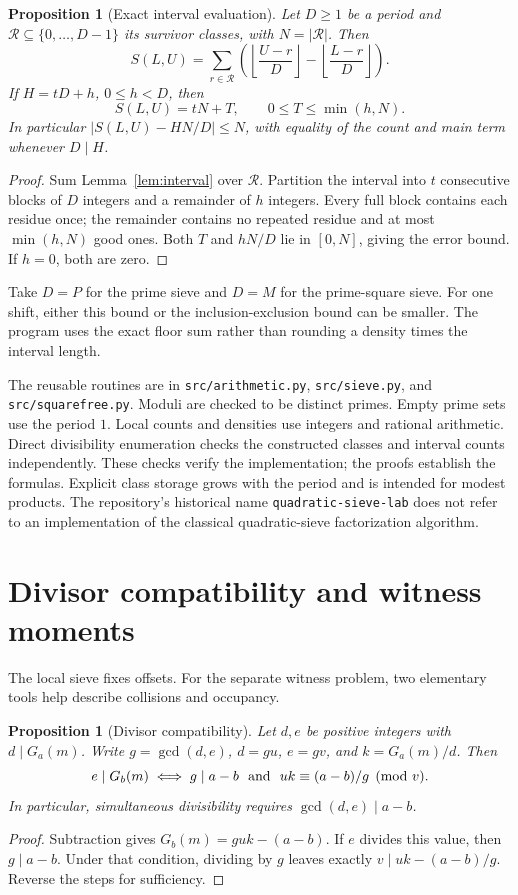 \documentclass[11pt]{article}
\newtheorem{proposition}[theorem]{Proposition}
\theoremstyle{definition}
\theoremstyle{remark}
\begin{document}
\begin{proposition}[Exact interval evaluation]\label{prop:exact}
Let $D\ge1$ be a period and $\mathcal R\subseteq\{0,\ldots,D-1\}$
its survivor classes, with $N=|\mathcal R|$. Then
\[
 S(L,U)=\sum_{r\in\mathcal R}
 \left(\left\lfloor\frac{U-r}D\right\rfloor-
       \left\lfloor\frac{L-r}D\right\rfloor\right).
\]
If $H=tD+h$, $0\le h<D$, then
\[
 S(L,U)=tN+T,\qquad 0\le T\le\min(h,N).
\]
In particular $|S(L,U)-HN/D|\le N$, with equality of the count
and main term whenever $D\mid H$.
\end{proposition}
\begin{proof}
Sum Lemma~\ref{lem:interval} over $\mathcal R$. Partition the interval
into $t$ consecutive blocks of $D$ integers and a remainder of $h$
integers. Every full block contains each residue once; the remainder
contains no repeated residue and at most $\min(h,N)$ good ones.
Both $T$ and $hN/D$ lie in $[0,N]$, giving the error bound.
If $h=0$, both are zero.
\end{proof}

Take $D=P$ for the prime sieve and $D=M$ for the prime-square sieve.
For one shift, either this bound or the inclusion-exclusion bound
can be smaller. The program uses the exact floor sum rather than
rounding a density times the interval length.

The reusable routines are in \texttt{src/arithmetic.py},
\texttt{src/sieve.py}, and \texttt{src/squarefree.py}.
Moduli are checked to be distinct primes. Empty prime sets use
the period $1$. Local counts and densities use integers and rational
arithmetic. Direct divisibility enumeration checks the constructed
classes and interval counts independently. These checks verify
the implementation; the proofs establish the formulas.
Explicit class storage grows with the period and is intended for
modest products. The repository's historical name
\texttt{quadratic-sieve-lab} does not refer to an implementation of
the classical quadratic-sieve factorization algorithm.

\section{Divisor compatibility and witness moments}
The local sieve fixes offsets. For the separate witness problem,
two elementary tools help describe collisions and occupancy.

\begin{proposition}[Divisor compatibility]\label{prop:quotient}
Let $d,e$ be positive integers with $d\mid G_a(m)$. Write
$g=\gcd(d,e)$, $d=gu$, $e=gv$, and $k=G_a(m)/d$. Then
\[
 e\mid G_b(m)\iff
 g\mid a-b\ \hbox{ and }\ uk\equiv(a-b)/g\pmod v.
\]
In particular, simultaneous divisibility requires $\gcd(d,e)\mid a-b$.
\end{proposition}
\begin{proof}
Subtraction gives $G_b(m)=guk-(a-b)$. If $e$ divides this value,
then $g\mid a-b$. Under that condition, dividing by $g$ leaves
exactly $v\mid uk-(a-b)/g$. Reverse the steps for sufficiency.
\end{proof}
\end{document}
